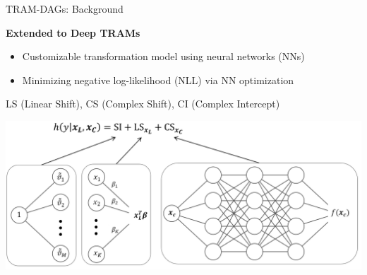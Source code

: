 \documentclass[onlytextwidth,english]{beamer}\usepackage[]{graphicx}\usepackage[]{xcolor}
\begin{document}
% 
% 
% 
% 
% 
% 
% 
% 
% 
% 
% 
% 
% 
% 
% 
% 
% 
% 
% 
% 





\begin{frame}{TRAM-DAGs: Background}

\textbf{Extended to Deep TRAMs} \citep{sick2020}
  \begin{itemize}
  \item Customizable transformation model using neural networks (NNs)
  \item Minimizing negative log-likelihood (NLL) via NN optimization
  \end{itemize}

\vspace{0.2cm}
 LS (Linear Shift), CS (Complex Shift), CI (Complex Intercept)

  \vfill
  \centering
  \includegraphics[width=0.9\linewidth]{img/deep_TRAM.png}
\end{frame}
\end{document}
